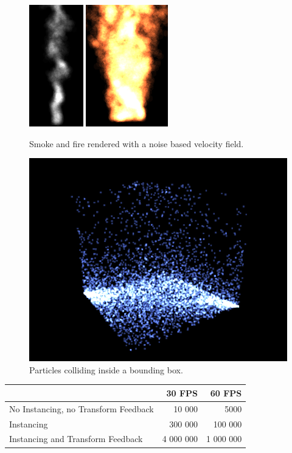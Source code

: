 \documentclass[report]{vgtc}
\begin{document}
\begin{figure}[H]
\includegraphics[height=200px]{img/smoke.png}
\includegraphics[height=200px]{img/fire.png}
\caption{Smoke and fire rendered with a noise based velocity field.}
\end{figure}

\begin{figure}[H]
\includegraphics[scale=0.57]{img/cube.png}
\caption{Particles colliding inside a bounding box.}
\end{figure}

\begin{table}[H]
	\begin{tabular}{l | r | r}
		  & 30 FPS & 60 FPS   \\[0.75ex] \hline
  		No Instancing, no Transform Feedback & 10 000 & 5000  \\[0.75ex]
  		Instancing & 300 000 & 100 000  \\[0.75ex]
		Instancing and Transform Feedback & 4 000 000 & 1 000 000 \\[0.75ex]
	\end{tabular}
\end{table}	
\end{document}

